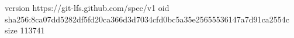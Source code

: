 version https://git-lfs.github.com/spec/v1
oid sha256:8ca07dd5282df5fd20ca366d3d7034cfd0bc5a35e25655536147a7d91ca2554c
size 113741
